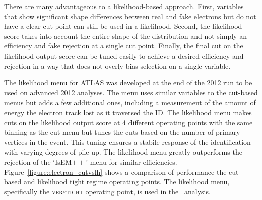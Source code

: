 There are many advantageous to a likelihood-based approach. First, variables that show significant shape differences between real and fake electrons but do not have a clear cut point can still be used in a likelihood. Second, the likelihood score takes into account the entire shape of the distribution and not simply an efficiency and fake rejection at a single cut point. Finally, the final cut on the likelihood output score can be tuned easily to achieve a desired efficiency and rejection in a way that does not overly bias selection on a single variable. 

The likelihood menu for ATLAS was developed at the end of the 2012 run to be used on advanced 2012 analyses. The menu uses similar variables to the cut-based menus but adds a few additional ones, including a measurement of the amount of energy the electron track lost as it traversed the ID. The likelihood menu makes cuts on the likelihood output score at 4 different operating points with the same binning as the cut menu but tunes the cuts based on the number of primary vertices in the event. This tuning ensures a stabile response of the identification with varying degrees of pile-up. The likelihood menu greatly outperforms the rejection of the `IsEM$++$' menu for similar efficiencies. Figure~\ref{figure:electron_cutvslh} shows a comparison of performance the cut-based and likelihood tight regime operating points. The likelihood menu, specifically the \textsc{verytight} operating point, is used in the \tth\ analysis.  

